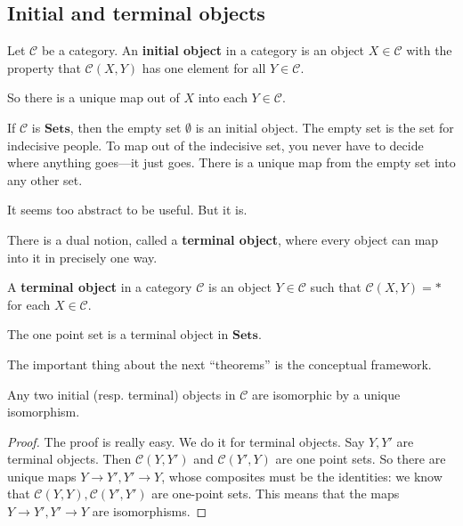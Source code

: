 \subsection{Initial and terminal objects}


\begin{definition}
Let $\mathcal{C}$ be a category. An \textbf{initial object} in a category is an
object $X \in \mathcal{C}$ with the property that $\mathcal{C}(X, Y)$ has one
element for all $Y \in \mathcal{C}$.

So there is a unique map out of $X$ into each $Y \in \mathcal{C}$.
\end{definition}


\begin{example}
If $\mathcal{C}$ is $\mathbf{Sets}$, then the empty set $\emptyset$ is an
initial object. The empty set is the set for indecisive people. To map out of
the indecisive set, you never have to decide where anything goes---it just
goes. There is a unique map from the empty set into any other set.
\end{example}

It seems too abstract to be useful. But it is.

There is a dual notion, called a \textbf{terminal object}, where every object
can map into it in precisely one way.
\begin{definition}
A \textbf{terminal object} in a category $\mathcal{C}$ is an object $Y \in
\mathcal{C}$ such that $\mathcal{C}(X, Y) = \ast$ for each $X \in \mathcal{C}$.
\end{definition}

\begin{example}
The one point set is a terminal object in $\mathbf{Sets}$.
\end{example}

The important thing about the next ``theorems'' is the conceptual framework.
\begin{theorem}
Any two initial (resp. terminal) objects in $\mathcal{C}$ are isomorphic by a
unique isomorphism.
\end{theorem}
\begin{proof}
The proof is really easy. We do it for terminal objects. Say $Y, Y'$ are
terminal objects. Then $\mathcal{C}(Y, Y')$ and $\mathcal{C}(Y', Y)$ are one
point sets. So there are unique maps $Y \to Y', Y' \to Y$, whose composites
must be the identities: we know that $\mathcal{C}(Y, Y) , \mathcal{C}(Y', Y')$
are one-point sets. This means that the maps $Y \to Y', Y' \to Y$ are
isomorphisms.
\end{proof}


